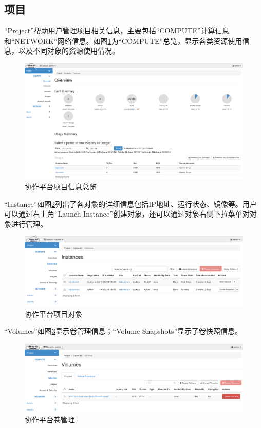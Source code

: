 \documentclass[12pt]{ctexart}%
\begin{document}
\subsection{项目}
``Project''帮助用户管理项目相关信息，主要包括``COMPUTE''计算信息和``NETWORK''网络信息。如图\ref{fig:projectcomputeoverview}为``COMPUTE''总览，显示各类资源使用信息，以及不同对象的资源使用情况。
\begin{figure}[!htb]
\centering
\includegraphics[width=6in]{./figures/Project_Compute_Overview}
\caption{协作平台项目信息总览}
\label{fig:projectcomputeoverview}
\end{figure}
``Instance''如图\ref{fig:projectcomputeinstances}列出了各对象的详细信息包括IP地址、运行状态、镜像等。用户可以通过右上角``Launch Instance''创建对象，还可以通过对象右侧下拉菜单对对象进行管理。
\begin{figure}[!htb]
\centering
\includegraphics[width=6in]{./figures/Project_Compute_Instances}
\caption{协作平台项目对象}
\label{fig:projectcomputeinstances}
\end{figure}
``Volumes''如图\ref{fig:projectcomputevolumes}显示卷管理信息；``Volume Snapshots''显示了卷快照信息。
\begin{figure}[!htb]
\centering
\includegraphics[width=6in]{./figures/Project_Compute_Volumes}
\caption{协作平台卷管理}
\label{fig:projectcomputevolumes}
\end{figure}
\end{document}
